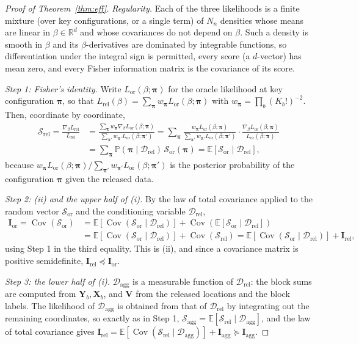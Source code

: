 \documentclass[11pt]{article}
\theoremstyle{definition}
\newcommand{\bX}{\mathbf{X}}
\newcommand{\bY}{\mathbf{Y}}
\newcommand{\bV}{\mathbf{V}}
\newcommand{\bpi}{\boldsymbol{\pi}}
\newcommand{\E}{\mathbb{E}}
\newcommand{\Prob}{\mathbb{P}}
\newcommand{\Cov}{\operatorname{Cov}}
\newcommand{\calD}{\mathcal{D}}
\newcommand{\rel}{\mathrm{rel}}
\newcommand{\agg}{\mathrm{agg}}
\newcommand{\orc}{\mathrm{or}}
\begin{document}
\begin{proof}[Proof of Theorem~\ref{thm:eff}]
\emph{Regularity.} Each of the three likelihoods is a finite mixture (over key configurations, or a single term) of $N_n$ densities whose means are linear in $\beta\in\mathbb R^d$ and whose covariances do not depend on $\beta$. Such a density is smooth in $\beta$ and its $\beta$-derivatives are dominated by integrable functions, so differentiation under the integral sign is permitted, every score (a $d$-vector) has mean zero, and every Fisher information matrix is the covariance of its score.

\emph{Step 1: Fisher's identity.} Write $L_\orc(\beta;\bpi)$ for the oracle likelihood at key configuration $\bpi$, so that $L_\rel(\beta)=\sum_{\bpi}w_{\bpi}L_\orc(\beta;\bpi)$ with $w_{\bpi}=\prod_b(K_b!)^{-2}$. Then, coordinate by coordinate,
\begin{align*}
\bm{\mathcal S}_\rel=\frac{\nabla_\beta L_\rel}{L_\rel}&=\frac{\sum_{\bpi}w_{\bpi}\nabla_\beta L_\orc(\beta;\bpi)}{\sum_{\bpi'}w_{\bpi'}L_\orc(\beta;\bpi')}=\sum_{\bpi}\frac{w_{\bpi}L_\orc(\beta;\bpi)}{\sum_{\bpi'}w_{\bpi'}L_\orc(\beta;\bpi')}\cdot\frac{\nabla_\beta L_\orc(\beta;\bpi)}{L_\orc(\beta;\bpi)}\\
&=\sum_{\bpi}\Prob(\bpi\mid\calD_\rel)\,\bm{\mathcal S}_\orc(\bpi)=\E[\bm{\mathcal S}_\orc\mid\calD_\rel],
\end{align*}
because $w_{\bpi}L_\orc(\beta;\bpi)/\sum_{\bpi'}w_{\bpi'}L_\orc(\beta;\bpi')$ is the posterior probability of the configuration $\bpi$ given the released data.

\emph{Step 2: (ii) and the upper half of (i).} By the law of total covariance applied to the random vector $\bm{\mathcal S}_\orc$ and the conditioning variable $\calD_\rel$,
\begin{align*}
\mathbf I_\orc=\Cov(\bm{\mathcal S}_\orc)&=\E[\Cov(\bm{\mathcal S}_\orc\mid\calD_\rel)]+\Cov(\E[\bm{\mathcal S}_\orc\mid\calD_\rel])\\
&=\E[\Cov(\bm{\mathcal S}_\orc\mid\calD_\rel)]+\Cov(\bm{\mathcal S}_\rel)=\E[\Cov(\bm{\mathcal S}_\orc\mid\calD_\rel)]+\mathbf I_\rel,
\end{align*}
using Step 1 in the third equality. This is (ii), and since a covariance matrix is positive semidefinite, $\mathbf I_\rel\preceq\mathbf I_\orc$.

\emph{Step 3: the lower half of (i).} $\calD_\agg$ is a measurable function of $\calD_\rel$: the block sums are computed from $\bY_b,\bX_b$, and $\bV$ from the released locations and the block labels. The likelihood of $\calD_\agg$ is obtained from that of $\calD_\rel$ by integrating out the remaining coordinates, so exactly as in Step 1, $\bm{\mathcal S}_\agg=\E[\bm{\mathcal S}_\rel\mid\calD_\agg]$, and the law of total covariance gives $\mathbf I_\rel=\E[\Cov(\bm{\mathcal S}_\rel\mid\calD_\agg)]+\mathbf I_\agg\succeq\mathbf I_\agg$.


\end{proof}
\end{document}
